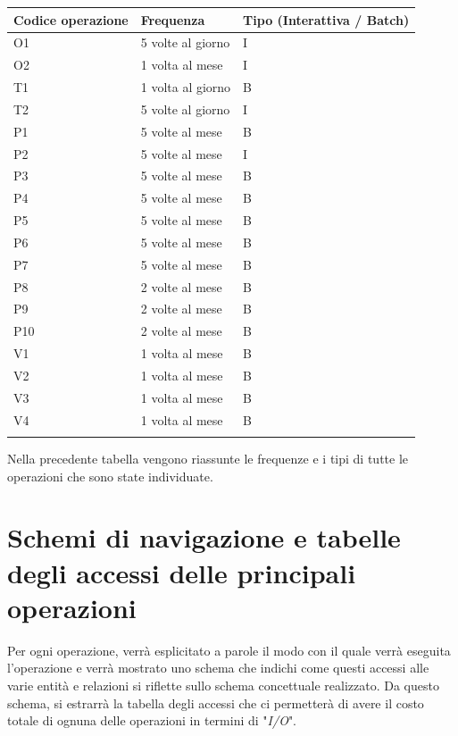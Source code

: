 \documentclass[a4paper, 12pt]{report}
\begin{document}
\begin{tabularx}{\linewidth}{X|X|X}
	\hline
	\textbf{Codice operazione} & \textbf{Frequenza} & \textbf{Tipo (Interattiva / Batch)}\\
	\hline
	\hline
	O1 & 5 volte al giorno & I\\
	\hline
	O2 & 1 volta al mese & I\\
	\hline
	T1 & 1 volta al giorno & B\\
	\hline
	T2 & 5 volte al giorno & I\\
	\hline
	P1 & 5 volte al mese & B\\
	\hline
	P2 & 5 volte al mese & I\\
	\hline
	P3 & 5 volte al mese & B\\
	\hline
	P4 & 5 volte al mese & B\\
	\hline
	P5 & 5 volte al mese & B\\
	\hline
	P6 & 5 volte al mese & B\\
	\hline
	P7 & 5 volte al mese & B\\
	\hline
	P8 & 2 volte al mese & B\\
	\hline
	P9 & 2 volte al mese & B\\
	\hline
	P10 & 2 volte al mese & B\\
	\hline
	V1 & 1 volta al mese & B\\
	\hline
	V2 & 1 volta al mese & B\\
	\hline
	V3 & 1 volta al mese & B\\
	\hline
	V4 & 1 volta al mese & B\\
	\hline
	\caption{Tabella della frequenza delle principali operazioni}
\end{tabularx}

Nella precedente tabella vengono riassunte le frequenze e i tipi di tutte le operazioni che sono state individuate.

\section{Schemi di navigazione e tabelle degli accessi delle principali operazioni}

Per ogni operazione, verrà esplicitato a parole il modo con il quale verrà eseguita l'operazione e verrà mostrato uno schema che indichi come questi
accessi alle varie entità e relazioni si riflette sullo schema concettuale realizzato. Da questo schema, si estrarrà la tabella degli accessi che ci
permetterà di avere il costo totale di ognuna delle operazioni in termini di "\textit{I/O}".
\end{document}
